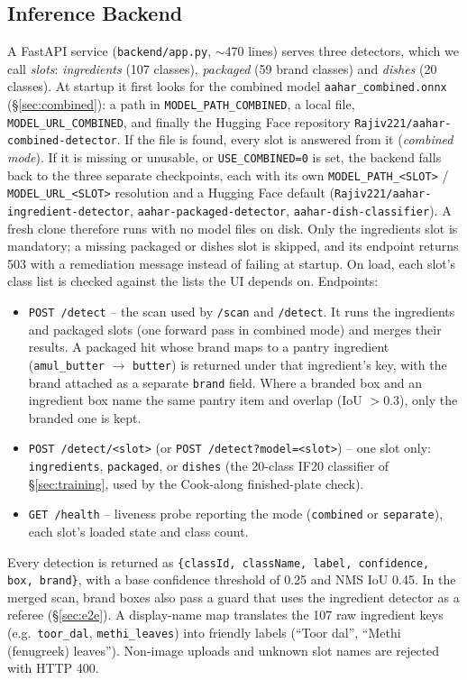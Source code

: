 \documentclass[journal]{IEEEtran}
\begin{document}
\subsection{Inference Backend}
A FastAPI service (\texttt{backend/app.py}, $\sim$470 lines) serves
three detectors, which we call \emph{slots}:
\textit{ingredients} (107 classes), \textit{packaged} (59 brand
classes) and \textit{dishes} (20 classes). At startup it first looks
for the combined model \texttt{aahar\_combined.onnx}
(\S\ref{sec:combined}): a path in \texttt{MODEL\_PATH\_COMBINED}, a
local file, \texttt{MODEL\_URL\_COMBINED}, and finally the Hugging Face
repository \texttt{Rajiv221/aahar-combined-detector}. If the file is
found, every slot is answered from it (\emph{combined mode}). If it
is missing or unusable, or \texttt{USE\_COMBINED=0} is set, the
backend falls back to the three separate checkpoints, each with its
own \texttt{MODEL\_PATH\_<SLOT>} / \texttt{MODEL\_URL\_<SLOT>}
resolution and a Hugging Face default
(\texttt{Rajiv221/aahar-ingredient-detector},
\texttt{aahar-packaged-detector}, \texttt{aahar-dish-classifier}). A
fresh clone therefore runs with no model files on disk. Only the
ingredients slot is mandatory; a missing packaged or dishes slot is
skipped, and its endpoint returns 503 with a remediation message
instead of failing at startup. On load, each slot's class list is
checked against the lists the UI depends on. Endpoints:
\begin{itemize}
  \item \texttt{POST /detect} -- the scan used by \texttt{/scan} and
        \texttt{/detect}. It runs the ingredients and packaged slots
        (one forward pass in combined mode) and merges their results.
        A packaged hit whose brand maps to a pantry ingredient
        (\texttt{amul\_butter} $\rightarrow$ \texttt{butter}) is
        returned under that ingredient's key, with the brand attached
        as a separate \texttt{brand} field. Where a branded box and
        an ingredient box name the same pantry item and overlap
        (IoU $>0.3$), only the branded one is kept.
  \item \texttt{POST /detect/<slot>} (or
        \texttt{POST /detect?model=<slot>}) -- one slot only:
        \texttt{ingredients}, \texttt{packaged}, or \texttt{dishes}
        (the 20-class IF20 classifier of \S\ref{sec:training}, used by
        the Cook-along finished-plate check).
  \item \texttt{GET /health} -- liveness probe reporting the mode
        (\texttt{combined} or \texttt{separate}), each slot's loaded
        state and class count.
\end{itemize}
Every detection is returned as \texttt{\{classId, className, label,
confidence, box, brand\}}, with a base confidence threshold of 0.25
and NMS IoU 0.45. In the merged scan, brand boxes also pass a guard
that uses the ingredient detector as a referee (\S\ref{sec:e2e}). A display-name map translates the
107 raw ingredient keys (e.g.\ \texttt{toor\_dal},
\texttt{methi\_leaves}) into friendly labels (``Toor dal'', ``Methi
(fenugreek) leaves''). Non-image uploads and unknown slot names are
rejected with HTTP 400.
\end{document}
